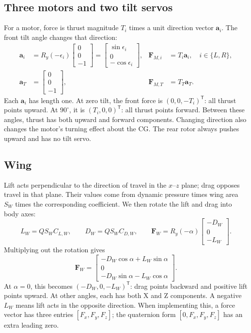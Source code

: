 \documentclass[11pt,a4paper]{article}
\numberwithin{equation}{section}
\newcommand{\vect}[1]{\boldsymbol{#1}}
\newcommand{\trans}{^{\mathsf T}}
\begin{document}
\subsection{Three motors and two tilt servos}
For a motor, force is thrust magnitude $T_i$ times a unit direction vector
$\vect a_i$. The front tilt angle changes that direction:
\begin{align}
 \vect a_i&=R_y(-\epsilon_i)\begin{bmatrix}0\\0\\-1\end{bmatrix}
 =\begin{bmatrix}\sin\epsilon_i\\0\\-\cos\epsilon_i\end{bmatrix},
 &\vect F_{M,i}&=T_i\vect a_i,\quad i\in\{L,R\},\label{eq:front}\\
 \vect a_T&=\begin{bmatrix}0\\0\\-1\end{bmatrix},
 &\vect F_{M,T}&=T_T\vect a_T.\label{eq:rear}
\end{align}
Each $\vect a_i$ has length one. At zero tilt, the front force is
$(0,0,-T_i)\trans$: all thrust points upward. At $90^\circ$, it is
$(T_i,0,0)\trans$: all thrust points forward. Between these angles,
thrust has both upward and forward components. Changing direction also
changes the motor's turning effect about the CG. The rear rotor always
pushes upward and has no tilt servo.

\subsection{Wing}
Lift acts perpendicular to the direction of travel in the $x$--$z$ plane;
drag opposes travel in that plane. Their values come from dynamic pressure
times wing area $S_W$ times the corresponding coefficient.
We then rotate the lift and drag into body axes:
\begin{equation}\label{eq:wing}
 L_W=QS_W C_{L,W},\qquad D_W=QS_W C_{D,W},\qquad
 \vect F_W=R_y(-\alpha)\begin{bmatrix}-D_W\\0\\-L_W\end{bmatrix}.
\end{equation}
Multiplying out the rotation gives
\begin{equation}
 \vect F_W=\begin{bmatrix}
  -D_W\cos\alpha+L_W\sin\alpha\\
  0\\
  -D_W\sin\alpha-L_W\cos\alpha
 \end{bmatrix}.
\end{equation}
At $\alpha=0$, this becomes $(-D_W,0,-L_W)\trans$: drag points backward
and positive lift points upward. At other angles, each has both X and Z
components. A negative $L_W$ means lift acts in the opposite direction.
When implementing this, a force vector has three entries $[F_x,F_y,F_z]$;
the quaternion form $[0,F_x,F_y,F_z]$ has an extra leading zero.
\end{document}

